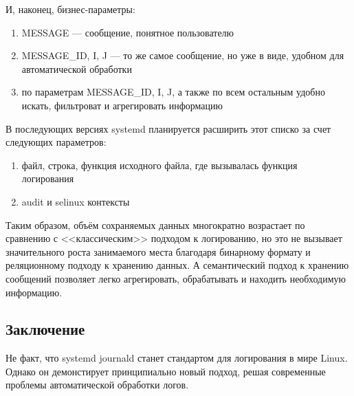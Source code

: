 \documentclass[10pt, a5paper]{article}
\begin{document}
И, наконец, бизнес-параметры:

\begin{enumerate}
  \item MESSAGE --- сообщение, понятное пользователю
  \item MESSAGE\_ID, I, J --- то же самое сообщение, но уже в виде, удобном для автоматической обработки
  \item по параметрам MESSAGE\_ID, I, J, а также по всем остальным удобно искать, фильтроват и агрегировать информацию
\end{enumerate}

В последующих версиях systemd планируется расширить этот списко за счет следующих параметров:

\begin{enumerate}
  \item файл, строка, функция исходного файла, где вызывалась функция логирования
  \item audit и selinux контексты
\end{enumerate}

Таким образом, объём сохраняемых данных многократно возрастает  по сравнению с <<классическим>> подходом к логированию, но это не вызывает значительного роста занимаемого места благодаря бинарному формату и реляционному подходу к хранению данных. А семантический подход к хранению сообщений позволяет легко агрегировать, обрабатывать и находить необходимую информацию.

\subsection*{Заключение}

Не факт, что systemd journald станет стандартом для логирования в мире Linux. Однако он демонстирует принципиально новый подход, решая современные проблемы автоматической обработки логов.
\end{document}
